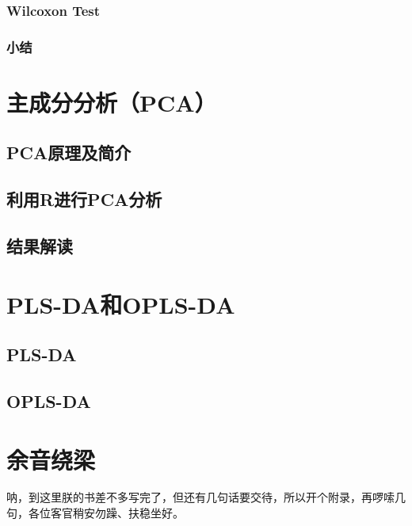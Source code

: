 \documentclass[]{ctexbook}
\begin{document}
\hypertarget{wilcoxon-test}{%
\subsection{Wilcoxon Test}\label{wilcoxon-test}}

\hypertarget{-2}{%
\subsection{小结}\label{-2}}

\hypertarget{chapPCA}{%
\chapter{主成分分析（PCA）}\label{chapPCA}}

\hypertarget{pca}{%
\section{PCA原理及简介}\label{pca}}

\hypertarget{rpca}{%
\section{利用R进行PCA分析}\label{rpca}}

\section{结果解读}

\hypertarget{chapPLS}{%
\chapter{PLS-DA和OPLS-DA}\label{chapPLS}}

\hypertarget{pls-da}{%
\section{PLS-DA}\label{pls-da}}

\hypertarget{opls-da}{%
\section{OPLS-DA}\label{opls-da}}

\cleardoublepage

\hypertarget{appendix-}{%
\appendix {}}


\hypertarget{sound}{%
\chapter{余音绕梁}\label{sound}}

呐，到这里朕的书差不多写完了，但还有几句话要交待，所以开个附录，再啰嗦几句，各位客官稍安勿躁、扶稳坐好。



\backmatter
\printindex
\end{document}
